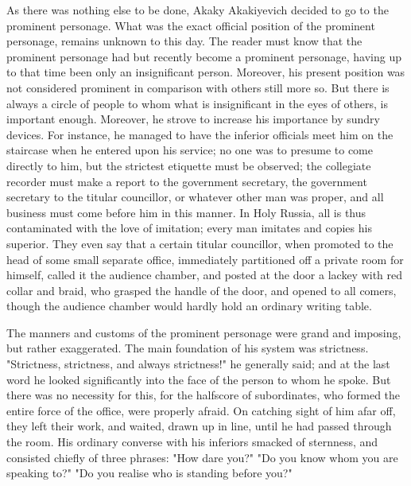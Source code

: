 As there was nothing else to be done, Akaky Akakiyevich decided to go
to the prominent personage. What was the exact official position of
the prominent personage, remains unknown to this day. The reader must
know that the prominent personage had but recently become a prominent
personage, having up to that time been only an insignificant person.
Moreover, his present position was not considered prominent in
comparison with others still more so. But there is always a circle of
people to whom what is insignificant in the eyes of others, is
important enough. Moreover, he strove to increase his importance by
sundry devices. For instance, he managed to have the inferior
officials meet him on the staircase when he entered upon his service;
no one was to presume to come directly to him, but the strictest
etiquette must be observed; the collegiate recorder must make a report
to the government secretary, the government secretary to the titular
councillor, or whatever other man was proper, and all business must
come before him in this manner. In Holy Russia, all is thus
contaminated with the love of imitation; every man imitates and copies
his superior. They even say that a certain titular councillor, when
promoted to the head of some small separate office, immediately
partitioned off a private room for himself, called it the audience
chamber, and posted at the door a lackey with red collar and braid,
who grasped the handle of the door, and opened to all comers, though
the audience chamber would hardly hold an ordinary writing table.

The manners and customs of the prominent personage were grand and
imposing, but rather exaggerated. The main foundation of his system
was strictness. "Strictness, strictness, and always strictness!" he
generally said; and at the last word he looked significantly into the
face of the person to whom he spoke. But there was no necessity for
this, for the halfscore of subordinates, who formed the entire force
of the office, were properly afraid. On catching sight of him afar
off, they left their work, and waited, drawn up in line, until he had
passed through the room. His ordinary converse with his inferiors
smacked of sternness, and consisted chiefly of three phrases: "How
dare you?" "Do you know whom you are speaking to?" "Do you realise who
is standing before you?"

